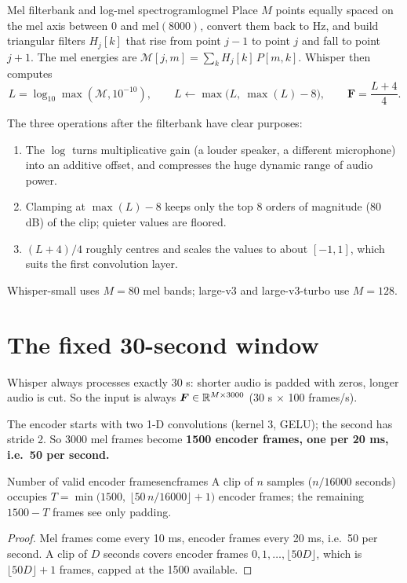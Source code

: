 \begin{definition}{Mel filterbank and log-mel spectrogram}{logmel}
Place $M$ points equally spaced on the mel axis between 0 and $\mathrm{mel}(8000)$, convert them back to Hz, and build triangular
filters $H_j[k]$ that rise from point $j-1$ to point $j$ and fall to point $j+1$. The mel energies are
$\mathcal M[j,m]=\sum_k H_j[k]\,P[m,k]$. Whisper then computes
\[
L=\log_{10}\max(\mathcal M,10^{-10}),\qquad L\leftarrow\max\big(L,\ \max(L)-8\big),\qquad \bm F=\frac{L+4}{4}.
\]
\end{definition}

The three operations after the filterbank have clear purposes:
\begin{enumerate}
\item The $\log$ turns multiplicative gain (a louder speaker, a different microphone) into an additive offset, and compresses the
huge dynamic range of audio power.
\item Clamping at $\max(L)-8$ keeps only the top 8 orders of magnitude (80 dB) of the clip; quieter values are floored.
\item $(L+4)/4$ roughly centres and scales the values to about $[-1,1]$, which suits the first convolution layer.
\end{enumerate}

Whisper-small uses $M=80$ mel bands; large-v3 and large-v3-turbo use $M=128$.

\section{The fixed 30-second window}

Whisper always processes exactly 30 s: shorter audio is padded with zeros, longer audio is cut. So the input is always
$\bm F\in\mathbb{R}^{M\times 3000}$ (30 s $\times$ 100 frames/s).

The encoder starts with two 1-D convolutions (kernel 3, GELU); the second has stride 2. So 3000 mel frames become \textbf{1500 encoder
frames, one per 20 ms, i.e.\ 50 per second.}

\begin{proposition}{Number of valid encoder frames}{encframes}
A clip of $n$ samples ($n/16000$ seconds) occupies $T=\min\!\big(1500,\ \lfloor 50\,n/16000\rfloor+1\big)$ encoder frames; the
remaining $1500-T$ frames see only padding.
\end{proposition}
\begin{proof}
Mel frames come every 10 ms, encoder frames every 20 ms, i.e.\ 50 per second. A clip of $D$ seconds covers encoder frames
$0,1,\dots,\lfloor 50D\rfloor$, which is $\lfloor 50D\rfloor+1$ frames, capped at the 1500 available.
\end{proof}

